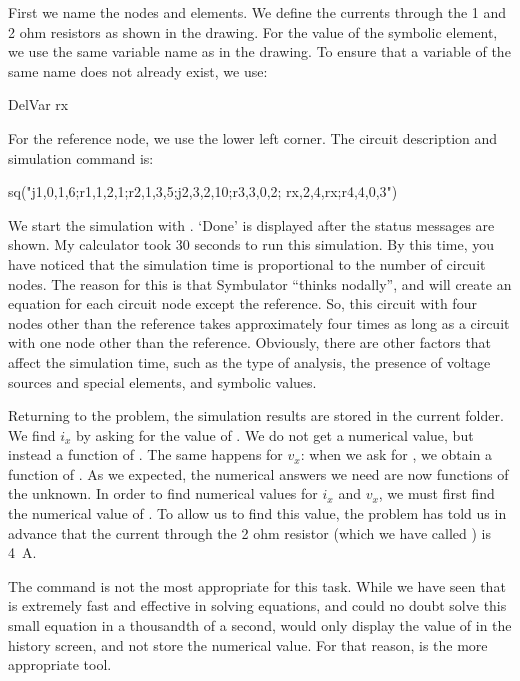 First we name the nodes and elements. We define the currents through
the 1 and 2 ohm resistors as shown in the drawing. For the value of
the symbolic element, we use the same variable name as in the
drawing. To ensure that a variable of the same name does not already
exist, we use:

\begin{entry}
DelVar rx
\end{entry}

For the reference node, we use the lower left corner. The circuit
description and simulation command is:

\begin{entry}
sq\dc("j1,0,1,6;r1,1,2,1;r2,1,3,5;j2,3,2,10;r3,3,0,2;
      rx,2,4,rx;r4,4,0,3")
\end{entry}

We start the simulation with . `Done' is displayed after
the status messages are shown. My calculator took 30 seconds to run
this simulation. By this time, you have noticed that the simulation
time is proportional to the number of circuit nodes. The reason for
this is that Symbulator ``thinks nodally'', and will create an
equation for each circuit node except the reference. So, this
circuit with four nodes other than the reference takes approximately
four times as long as a circuit with one node other than the
reference. Obviously, there are other factors that affect the
simulation time, such as the type of analysis, the presence of
voltage sources and special elements, and symbolic values.

Returning to the problem, the simulation results are stored in the
current folder. We find $i_x$ by asking for the value of .
We do not get a numerical value, but instead a function of
. The same happens for $v_x$: when we ask for ,
we obtain a function of . As we expected, the numerical
answers we need are now functions of the unknown. In order to find
numerical values for $i_x$ and $v_x$, we must first find the
numerical value of . To allow us to find this value, the
problem has told us in advance that the current through the 2 ohm
resistor (which we have called ) is 4~A.

The  command is not the most appropriate for this task.
While we have seen that  is extremely fast and effective
in solving equations, and could no doubt solve this small equation
in a thousandth of a second,  would only display the
value of  in the history screen, and not store the
numerical value. For that reason,  is the more
appropriate tool.

